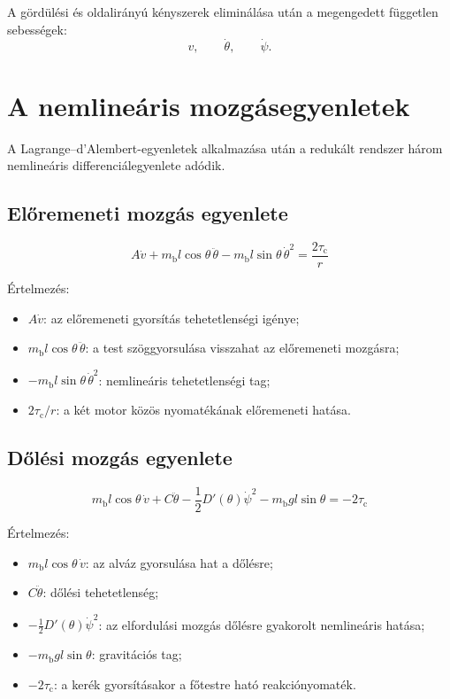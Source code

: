 \documentclass[12pt,a4paper]{article}
\newcommand{\mbody}{m_{\mathrm{b}}}
\newcommand{\tauc}{\tau_{\mathrm{c}}}
\begin{document}
	A gördülési és oldalirányú kényszerek eliminálása után a megengedett független sebességek:
	\begin{equation}
		v,\qquad \dot\theta,\qquad \dot\psi.
	\end{equation}
	
	\section{A nemlineáris mozgásegyenletek}
	
	A Lagrange--d'Alembert-egyenletek alkalmazása után a redukált rendszer három nemlineáris differenciálegyenlete adódik.
	
	\subsection{Előremeneti mozgás egyenlete}
	
	\begin{equation}
		\boxed{
			A\dot v
			+\mbody l\cos\theta\,\ddot\theta
			-\mbody l\sin\theta\,\dot\theta^2
			=\frac{2\tauc}{r}
		}
	\end{equation}
	
	Értelmezés:
	\begin{itemize}[leftmargin=2em]
		\item $A\dot v$: az előremeneti gyorsítás tehetetlenségi igénye;
		\item $\mbody l\cos\theta\,\ddot\theta$: a test szöggyorsulása visszahat az előremeneti mozgásra;
		\item $-\mbody l\sin\theta\,\dot\theta^2$: nemlineáris tehetetlenségi tag;
		\item $2\tauc/r$: a két motor közös nyomatékának előremeneti hatása.
	\end{itemize}
	
	\subsection{Dőlési mozgás egyenlete}
	
	\begin{equation}
		\boxed{
			\mbody l\cos\theta\,\dot v
			+C\ddot\theta
			-\frac{1}{2}D'(\theta)\dot\psi^2
			-\mbody g l\sin\theta
			=-2\tauc
		}
	\end{equation}
	
	Értelmezés:
	\begin{itemize}[leftmargin=2em]
		\item $\mbody l\cos\theta\,\dot v$: az alváz gyorsulása hat a dőlésre;
		\item $C\ddot\theta$: dőlési tehetetlenség;
		\item $-\tfrac12 D'(\theta)\dot\psi^2$: az elfordulási mozgás dőlésre gyakorolt nemlineáris hatása;
		\item $-\mbody g l\sin\theta$: gravitációs tag;
		\item $-2\tauc$: a kerék gyorsításakor a főtestre ható reakciónyomaték.
	\end{itemize}
	
\end{document}
